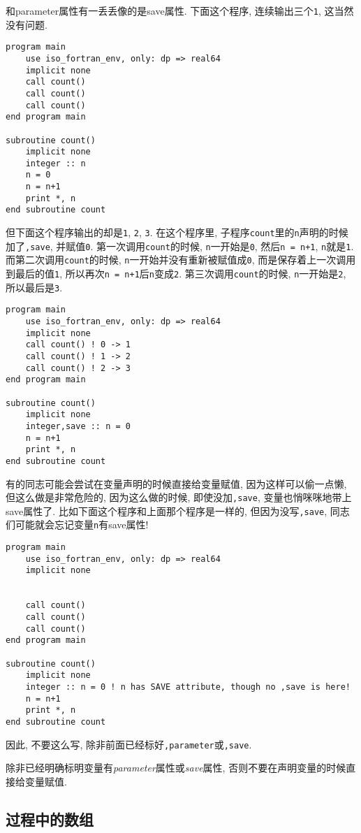 和parameter属性有一丢丢像的是save属性. 下面这个程序, 连续输出三个\verb|1|, 这当然没有问题.
\begin{verbatim}
program main
    use iso_fortran_env, only: dp => real64
    implicit none
    call count()
    call count()
    call count()
end program main

subroutine count()
    implicit none
    integer :: n
    n = 0
    n = n+1
    print *, n
end subroutine count
\end{verbatim}
但下面这个程序输出的却是\verb|1|, \verb|2|, \verb|3|. 在这个程序里, 子程序\verb|count|里的\verb|n|声明的时候加了\verb|,save|, 并赋值\verb|0|. 第一次调用\verb|count|的时候, \verb|n|一开始是\verb|0|, 然后\verb|n = n+1|, \verb|n|就是\verb|1|. 而第二次调用\verb|count|的时候, \verb|n|一开始并没有重新被赋值成\verb|0|, 而是保存着上一次调用到最后的值\verb|1|, 所以再次\verb|n = n+1|后\verb|n|变成\verb|2|. 第三次调用\verb|count|的时候, \verb|n|一开始是\verb|2|, 所以最后是\verb|3|.
\begin{verbatim}
program main
    use iso_fortran_env, only: dp => real64
    implicit none
    call count() ! 0 -> 1
    call count() ! 1 -> 2
    call count() ! 2 -> 3
end program main

subroutine count()
    implicit none
    integer,save :: n = 0
    n = n+1
    print *, n
end subroutine count
\end{verbatim}
有的同志可能会尝试在变量声明的时候直接给变量赋值, 因为这样可以偷一点懒, 但这么做是非常危险的, 因为这么做的时候, 即使没加\verb|,save|, 变量也悄咪咪地带上save属性了. 比如下面这个程序和上面那个程序是一样的, 但因为没写\verb|,save|, 同志们可能就会忘记变量\verb|n|有save属性!
\begin{verbatim}
program main
    use iso_fortran_env, only: dp => real64
    implicit none


    call count()
    call count()
    call count()
end program main

subroutine count()
    implicit none
    integer :: n = 0 ! n has SAVE attribute, though no ,save is here!
    n = n+1
    print *, n
end subroutine count
\end{verbatim}
因此, 不要这么写, 除非前面已经标好\verb|,parameter|或\verb|,save|.

\begin{principle}
    除非已经明确标明变量有\emph{parameter}属性或\emph{save}属性, 否则不要在声明变量的时候直接给变量赋值.
\end{principle}

\subsection{过程中的数组}


